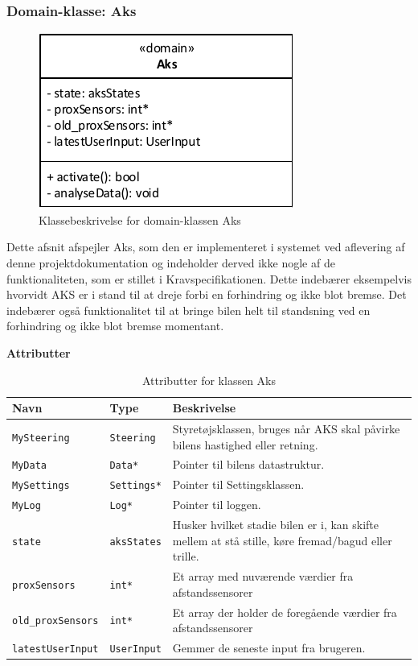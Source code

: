 \subsubsection{Domain-klasse: Aks}\label{sec:aks_design}

\begin{figure}[h]
\centering
\includegraphics[scale=1]{../fig/diagrammer/bil/cd_aks.pdf}
\caption{Klassebeskrivelse for domain-klassen Aks}
\label{fig:cd_aks}
\end{figure}

Dette afsnit afspejler Aks, som den er implementeret i systemet ved aflevering af denne projektdokumentation og indeholder derved ikke nogle af de funktionaliteten, som er stillet i Kravspecifikationen.
Dette indebærer eksempelvis hvorvidt AKS er i stand til at dreje forbi en forhindring og ikke blot bremse. Det indebærer også funktionalitet til at bringe bilen helt til standsning ved en forhindring og ikke blot bremse momentant.

\textbf{Attributter}

\begin{table}[h]
\begin{tabularx}{\textwidth}{| Z | Z | L{9cm} |} \hline
Navn & Type & Beskrivelse \\\hline
\texttt{MySteering} & \texttt{Steering} & Styretøjsklassen, bruges når AKS skal påvirke bilens hastighed eller retning.\\\hline
\texttt{MyData} & \texttt{Data*} & Pointer til bilens datastruktur.\\\hline
\texttt{MySettings} & \texttt{Settings*} & Pointer til Settingsklassen. \\\hline
\texttt{MyLog} & \texttt{Log*} & Pointer til loggen. \\\hline
\texttt{state} & \texttt{aksStates} & Husker hvilket stadie bilen er i, kan skifte mellem at stå stille, køre fremad/bagud eller trille. \\\hline
\texttt{proxSensors} & \texttt{int*} & Et array med nuværende værdier fra afstandssensorer \\\hline
\texttt{old\_proxSensors} & \texttt{int*} & Et array der holder de foregående værdier fra afstandssensorer \\\hline
\texttt{latestUserInput} & \texttt{UserInput} & Gemmer de seneste input fra brugeren. \\ \hline
\end{tabularx}
\caption{Attributter for klassen Aks}
\label{table:attr_aks}
\end{table}

